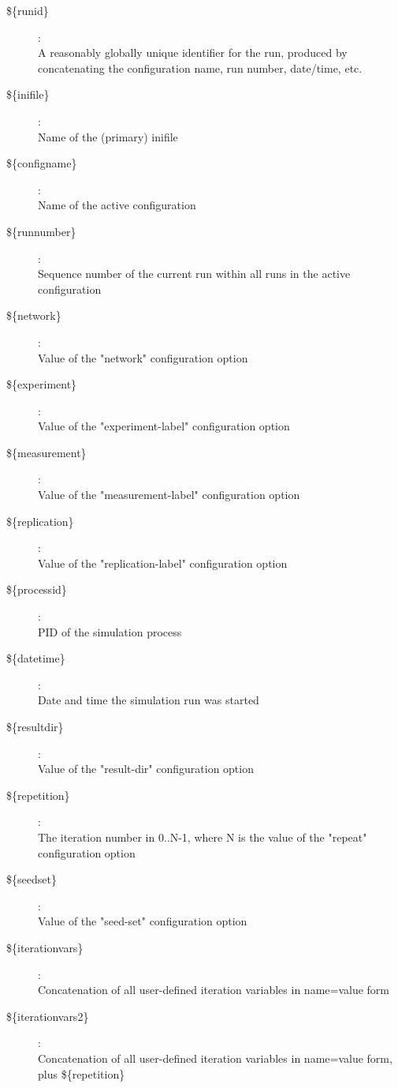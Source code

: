 \begin{description}
\item[\$\{runid\}] : \\
    A reasonably globally unique identifier for the run, produced by
    concatenating the configuration name, run number, date/time, etc.
\item[\$\{inifile\}] : \\
    Name of the (primary) inifile
\item[\$\{configname\}] : \\
    Name of the active configuration
\item[\$\{runnumber\}] : \\
    Sequence number of the current run within all runs in the active
    configuration
\item[\$\{network\}] : \\
    Value of the "network" configuration option
\item[\$\{experiment\}] : \\
    Value of the "experiment-label" configuration option
\item[\$\{measurement\}] : \\
    Value of the "measurement-label" configuration option
\item[\$\{replication\}] : \\
    Value of the "replication-label" configuration option
\item[\$\{processid\}] : \\
    PID of the simulation process
\item[\$\{datetime\}] : \\
    Date and time the simulation run was started
\item[\$\{resultdir\}] : \\
    Value of the "result-dir" configuration option
\item[\$\{repetition\}] : \\
    The iteration number in 0..N-1, where N is the value of the "repeat"
    configuration option
\item[\$\{seedset\}] : \\
    Value of the "seed-set" configuration option
\item[\$\{iterationvars\}] : \\
    Concatenation of all user-defined iteration variables in name=value form
\item[\$\{iterationvars2\}] : \\
    Concatenation of all user-defined iteration variables in name=value form,
    plus \$\{repetition\}
\end{description}

